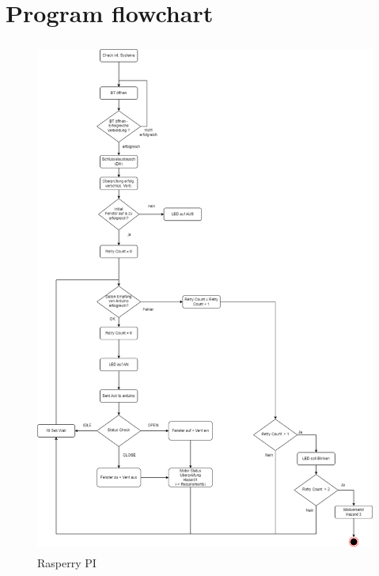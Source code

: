 \section{Program flowchart}
\label{chapter3}


\begin{figure}[h]
	\includegraphics[height=170mm,left]{IDP_Designdokument/images/ablaufdiag_pi.drawio.png}
	\centering
	\caption{Rasperry PI}
	\label{fig:system}
\end{figure}

